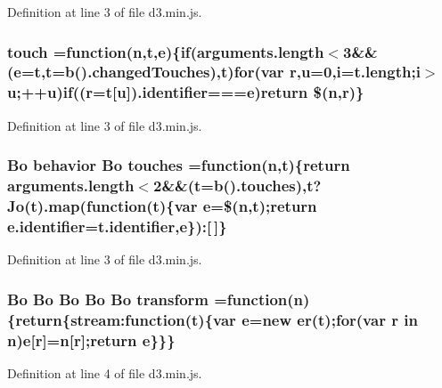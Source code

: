 Definition at line 3 of file d3.\+min.\+js.

\subsubsection[{touch}]{ touch =function({\bf n},t,{\bf e})\{{\bf if}(arguments.\+length$<$3\&\&({\bf e}=t,t={\bf b}().changed\+Touches),t){\bf for}(var {\bf r},u=0,{\bf i}=t.\+length;{\bf i}$>$u;++u){\bf if}(({\bf r}=t[u]).identifier==={\bf e}){\bf return} \$({\bf n},{\bf r})\}}\label{d3_8min_8js_ac02e1e88d47d634e07bef5293bf5e0cc}


Definition at line 3 of file d3.\+min.\+js.

\subsubsection[{touches}]{ {\bf Bo} {\bf behavior} {\bf Bo} touches =function({\bf n},t)\{{\bf return} arguments.\+length$<$2\&\&(t={\bf b}().touches),t?{\bf Jo}(t).{\bf map}(function(t)\{var {\bf e}=\$({\bf n},t);{\bf return} e.\+identifier=t.\+identifier,{\bf e}\})\+:[$\,$]\}}\label{d3_8min_8js_ab66d9227b04d6b5e0b4e591b1968204b}


Definition at line 3 of file d3.\+min.\+js.

\subsubsection[{transform}]{ {\bf Bo} {\bf Bo} {\bf Bo} {\bf Bo} {\bf Bo} transform =function({\bf n})\{{\bf return}\{stream\+:function(t)\{var {\bf e}=new {\bf er}(t);{\bf for}(var {\bf r} in {\bf n}){\bf e}[{\bf r}]={\bf n}[{\bf r}];{\bf return} {\bf e}\}\}\}}\label{d3_8min_8js_a2631b00e9a5e3a8814dae2be26381c3f}


Definition at line 4 of file d3.\+min.\+js.

